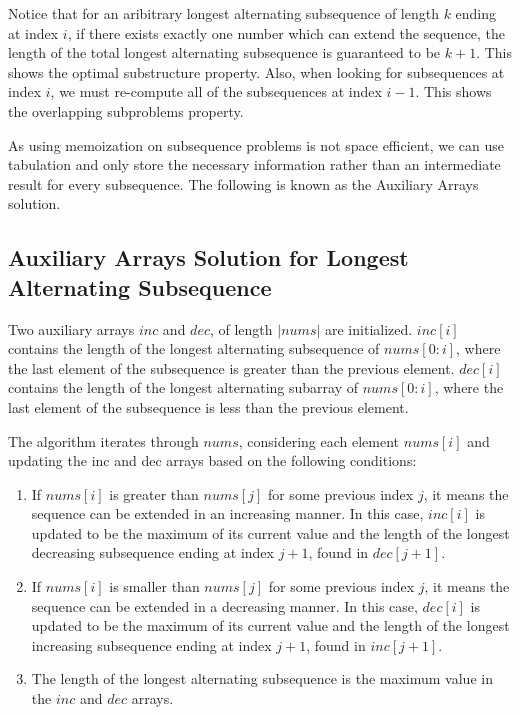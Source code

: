 Notice that for an aribitrary longest alternating subsequence of length $k$ ending at index $i$,
if there exists exactly one number which can extend the sequence,
the length of the total longest alternating subsequence is guaranteed to be $k+1$.
This shows the optimal substructure property.
Also, when looking for subsequences at index $i$,
we must re-compute all of the subsequences at index $i-1$.
This shows the overlapping subproblems property.

As using memoization on subsequence problems is not space efficient,
we can use tabulation and only store the necessary information rather than an intermediate result for every subsequence.
The following is known as the Auxiliary Arrays solution.

\subsection{Auxiliary Arrays Solution for Longest Alternating Subsequence}
Two auxiliary arrays $inc$ and $dec$, of length $|nums|$ are initialized.
$inc[i]$ contains the length of the longest alternating subsequence of $nums[0:i]$,
where the last element of the subsequence is greater than the previous element.
$dec[i]$ contains the length of the longest alternating subarray of $nums[0:i]$,
where the last element of the subsequence is less than the previous element.

The algorithm iterates through $nums$, considering each element $nums[i]$ and updating the inc and dec arrays based on the following conditions:

\begin{enumerate}
    \item If $nums[i]$ is greater than $nums[j]$ for some previous index $j$, it means the sequence can be extended in an increasing manner.
    In this case, $inc[i]$ is updated to be the maximum of its current value and the length of the longest decreasing subsequence ending at index $j+1$, found in $dec[j+1]$.

    \item If $nums[i]$ is smaller than $nums[j]$ for some previous index $j$, it means the sequence can be extended in a decreasing manner.
    In this case, $dec[i]$ is updated to be the maximum of its current value and the length of the longest increasing subsequence ending at index $j+1$, found in $inc[j+1]$.

    \item The length of the longest alternating subsequence is the maximum value in the $inc$ and $dec$ arrays.
\end{enumerate}


